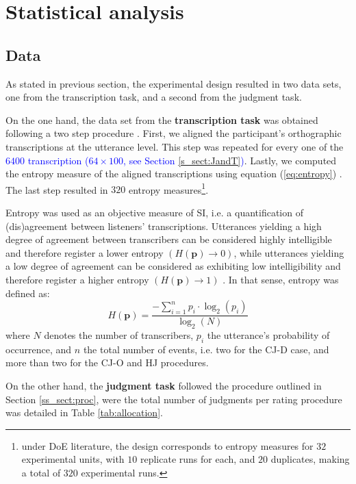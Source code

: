 \section{Statistical analysis}
%
\subsection{Data} \label{s_sect:data}
%
As stated in previous section, the experimental design resulted in two data sets, one from the transcription task, and a second from the judgment task.

On the one hand, the data set from the \textbf{transcription task} was obtained following a two step procedure \citep{Boonen_et_al_2021}. First, we aligned the participant's orthographic  transcriptions at the utterance level. This step was repeated for every one of the \textcolor{blue}{$6400$ transcription ($64 \times 100$, see Section \ref{s_sect:JandT})}. Lastly, we computed the entropy measure of the aligned transcriptions using equation (\ref{eq:entropy}) \citep{Shannon_1948}. The last step resulted in $320$ entropy measures\footnote{\label{foot:doe}under DoE literature, the design corresponds to entropy measures for $32$ experimental units, with $10$ replicate runs for each, and $20$ duplicates, making a total of $320$ experimental runs.}.

Entropy was used as an objective measure of SI, i.e. a quantification of (dis)agreement between listeners' transcriptions. Utterances yielding a high degree of agreement between transcribers can be considered highly intelligible and therefore register a lower entropy $\left( H(\pmb{p}) \rightarrow 0 \right)$, while utterances yielding a low degree of agreement can be considered as exhibiting low intelligibility and therefore register a higher entropy $\left( H(\pmb{p}) \rightarrow 1 \right)$ \citep{Boonen_et_al_2021, Faes_et_al_2021}. In that sense, entropy was defined as: 
%
\begin{equation} \label{eq:entropy}
	H(\pmb{p}) = \frac{-\sum_{i=1}^{n} p_{i} \cdot \log_{2}(p_{i})}{\log_{2}(N)}
\end{equation}
%
where $N$ denotes the number of transcribers, $p_{i}$ the utterance's probability of occurrence, and $n$ the total number of events, i.e. two for the CJ-D case, and more than two for the CJ-O and HJ procedures.

On the other hand, the \textbf{judgment task} followed the procedure outlined in Section \ref{ss_sect:proc}, were the total number of judgments per rating procedure was detailed in Table \ref{tab:allocation}. 

